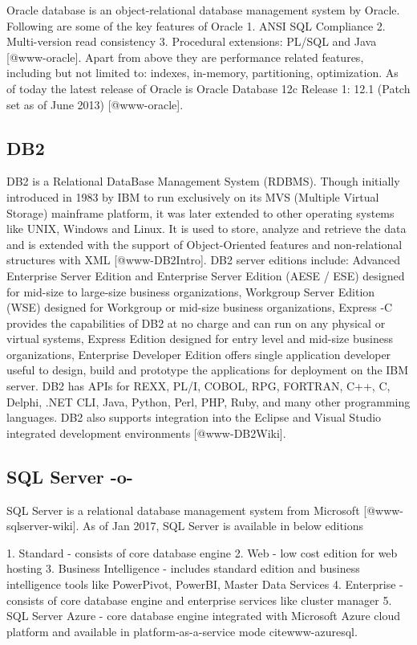 Oracle database is an object-relational database management system by
Oracle. Following are some of the key features of Oracle 1. ANSI SQL
Compliance 2. Multi-version read consistency 3. Procedural extensions:
PL/SQL and Java [@www-oracle].  Apart from above they are
performance related features, including but not limited to: indexes,
in-memory, partitioning, optimization.  As of today the latest release
of Oracle is Oracle Database 12c Release 1: 12.1 (Patch set as of June
2013) [@www-oracle].




\subsection{DB2}

DB2 is a Relational DataBase Management System (RDBMS). Though
initially introduced in 1983 by IBM to run exclusively on its MVS
(Multiple Virtual Storage) mainframe platform, it was later extended
to other operating systems like UNIX, Windows and Linux. It is used to
store, analyze and retrieve the data and is extended with the support
of Object-Oriented features and non-relational structures with
XML [@www-DB2Intro]. DB2 server editions include: Advanced
Enterprise Server Edition and Enterprise Server Edition (AESE / ESE)
designed for mid-size to large-size business organizations, Workgroup
Server Edition (WSE) designed for Workgroup or mid-size business
organizations, Express -C provides the capabilities of DB2 at no
charge and can run on any physical or virtual systems, Express Edition
designed for entry level and mid-size business organizations,
Enterprise Developer Edition offers single application developer
useful to design, build and prototype the applications for deployment
on the IBM server. DB2 has APIs for REXX, PL/I, COBOL, RPG, FORTRAN,
C++, C, Delphi, .NET CLI, Java, Python, Perl, PHP, Ruby, and many
other programming languages. DB2 also supports integration into the
Eclipse and Visual Studio integrated development
environments [@www-DB2Wiki].

\subsection{SQL Server -o-}

SQL Server is a relational database management system from
Microsoft [@www-sqlserver-wiki].  As of Jan 2017, SQL Server is
available in below editions

     1. Standard - consists of core database engine
     2. Web - low cost edition for web hosting
     3. Business Intelligence - includes standard edition and business
        intelligence tools like PowerPivot, PowerBI, Master Data Services
     4. Enterprise - consists of core database engine and enterprise services
        like cluster manager
     5. SQL Server Azure - core database engine
        integrated with Microsoft Azure cloud platform and available in
        platform-as-a-service mode cite{www-azuresql}.

